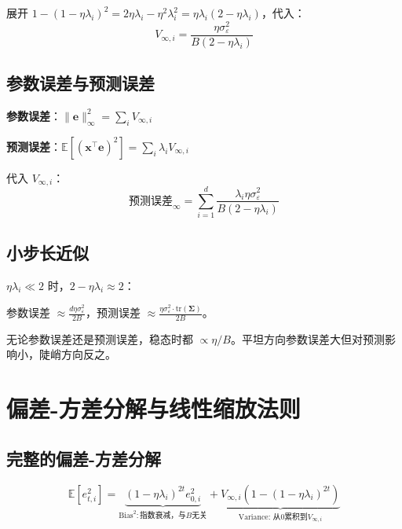 \documentclass[12pt, a4paper]{ctexart}
\begin{document}
展开 $1 - (1-\eta\lambda_i)^2 = 2\eta\lambda_i - \eta^2\lambda_i^2 = \eta\lambda_i(2-\eta\lambda_i)$，代入：
\begin{equation}
    \boxed{V_{\infty,i} = \frac{\eta \sigma_\varepsilon^2}{B(2 - \eta\lambda_i)}}
\end{equation}

\subsection{参数误差与预测误差}

\textbf{参数误差}：$\|\mathbf{e}\|^2_\infty = \sum_i V_{\infty,i}$

\textbf{预测误差}：$\mathbb{E}[(\mathbf{x}^\top\mathbf{e})^2] = \sum_i \lambda_i V_{\infty,i}$

代入 $V_{\infty,i}$：
\begin{equation}
    \boxed{\text{预测误差}_\infty = \sum_{i=1}^{d} \frac{\lambda_i \eta \sigma_\varepsilon^2}{B(2 - \eta\lambda_i)}}
\end{equation}

\subsection{小步长近似}

$\eta\lambda_i \ll 2$ 时，$2 - \eta\lambda_i \approx 2$：

参数误差 $\approx \frac{d\eta\sigma_\varepsilon^2}{2B}$，预测误差 $\approx \frac{\eta\sigma_\varepsilon^2 \cdot \text{tr}(\boldsymbol{\Sigma})}{2B}$。

\begin{keypoint}
无论参数误差还是预测误差，稳态时都 $\propto \eta/B$。平坦方向参数误差大但对预测影响小，陡峭方向反之。
\end{keypoint}


\section{偏差-方差分解与线性缩放法则}

\subsection{完整的偏差-方差分解}

\begin{equation}
    \mathbb{E}[e_{t,i}^2] = \underbrace{(1-\eta\lambda_i)^{2t} e_{0,i}^2}_{\text{Bias}^2:\text{指数衰减，与}B\text{无关}} + \underbrace{V_{\infty,i}(1 - (1-\eta\lambda_i)^{2t})}_{\text{Variance: 从0累积到}V_{\infty,i}}
\end{equation}
\end{document}
